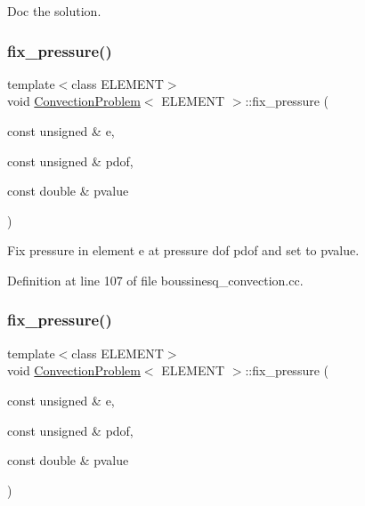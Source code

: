 Doc the solution. 

\mbox{\label{classConvectionProblem_a5f4904e658a5888814e825ac060c8f71}} 
\subsubsection{\texorpdfstring{fix\+\_\+pressure()}{fix\_pressure()}\hspace{0.1cm}{\footnotesize\ttfamily [1/2]}}
{\footnotesize\ttfamily template$<$class E\+L\+E\+M\+E\+NT$>$ \\
void \hyperlink{classConvectionProblem}{Convection\+Problem}$<$ E\+L\+E\+M\+E\+NT $>$\+::fix\+\_\+pressure (\begin{DoxyParamCaption}\item[{const unsigned \&}]{e,  }\item[{const unsigned \&}]{pdof,  }\item[{const double \&}]{pvalue }\end{DoxyParamCaption})\hspace{0.3cm}{\ttfamily [inline]}}



Fix pressure in element e at pressure dof pdof and set to pvalue. 



Definition at line 107 of file boussinesq\+\_\+convection.\+cc.

\mbox{\label{classConvectionProblem_a5f4904e658a5888814e825ac060c8f71}} 
\subsubsection{\texorpdfstring{fix\+\_\+pressure()}{fix\_pressure()}\hspace{0.1cm}{\footnotesize\ttfamily [2/2]}}
{\footnotesize\ttfamily template$<$class E\+L\+E\+M\+E\+NT$>$ \\
void \hyperlink{classConvectionProblem}{Convection\+Problem}$<$ E\+L\+E\+M\+E\+NT $>$\+::fix\+\_\+pressure (\begin{DoxyParamCaption}\item[{const unsigned \&}]{e,  }\item[{const unsigned \&}]{pdof,  }\item[{const double \&}]{pvalue }\end{DoxyParamCaption})\hspace{0.3cm}{\ttfamily [inline]}}



